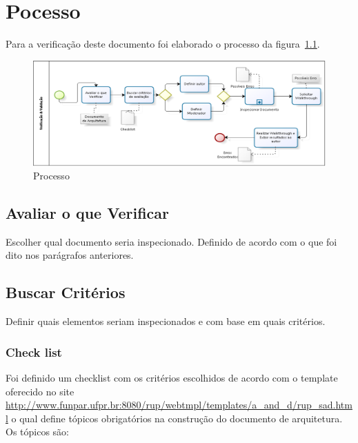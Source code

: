 \chapter{Pocesso}

Para a verificação deste documento foi elaborado o processo da figura~\ref{fig:processo}.


\begin{figure}[H]
  \center
  \includegraphics[width=1\textwidth]{figuras/processo.png}
  \caption{Processo}
  \label{fig:processo}
\end{figure}

\section{Avaliar o que Verificar}

Escolher qual documento seria inspecionado. Definido de acordo com o que foi dito nos parágrafos anteriores. 

\section{Buscar Critérios}

Definir quais elementos seriam inspecionados e com base em quais critérios. 

    \subsection{Check list}
    Foi definido um checklist com os critérios escolhidos de acordo com o template oferecido no site \url{http://www.funpar.ufpr.br:8080/rup/webtmpl/templates/a_and_d/rup_sad.html} o qual define tópicos obrigatórios na construção do documento de arquitetura. Os tópicos são: 

